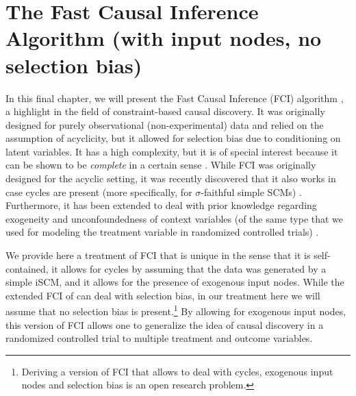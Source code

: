\section{The Fast Causal Inference Algorithm (with input nodes, no selection bias)}\label{sec:fci}

In this final chapter, we will present the Fast Causal Inference (FCI) algorithm \cite{SMR1995,SMR1999}, a highlight in the field of constraint-based causal discovery.
It was originally designed for purely observational (non-experimental) data and relied on the assumption of acyclicity, but it allowed for selection bias due to conditioning on latent variables.
It has a high complexity, but it is of special interest because it can be shown to be \emph{complete} in a certain sense \cite{Zhang2008_AI}. 
While FCI was originally designed for the acyclic setting, it was recently discovered that it also works in case cycles are present (more specifically, for $\sigma$-faithful simple SCMs) \cite{MooijClaassen_UAI_20}.
Furthermore, it has been extended to deal with prior knowledge regarding exogeneity and unconfoundedness of context variables (of the same type that we used for modeling the treatment variable in randomized controlled trials) \cite{Mooij++_JMLR_20}.

We provide here a treatment of FCI that is unique in the sense that it is self-contained, it allows for cycles by assuming that the data was generated by a simple iSCM, and it allows for the presence of exogenous input nodes.
While the extended FCI of \cite{SMR1999} can deal with selection bias, in our treatment here we will assume that no selection bias is present.\footnote{Deriving a version of FCI that allows to deal with cycles, exogenous input nodes and selection bias is an open research problem.}
By allowing for exogenous input nodes, this version of FCI allows one to generalize the idea of causal discovery in a randomized controlled trial to multiple treatment and outcome variables.



